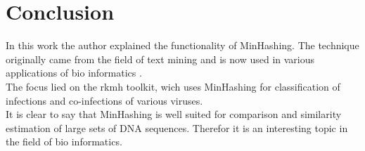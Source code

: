 \section{Conclusion}

In this work the author explained the functionality of MinHashing. The technique originally came from the field of text mining and is now used in various applications of bio informatics \cite{rkmh, mash, sourmash}.\\

The focus lied on the rkmh toolkit, wich uses MinHashing for classification of infections and co-infections of various viruses.\\

It is clear to say that MinHashing is well suited for comparison and similarity estimation of large sets of DNA sequences. Therefor it is an interesting topic in the field of bio informatics.\\